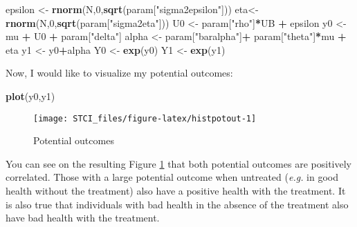 \documentclass[]{book}
\newenvironment{Shaded}{\begin{snugshade}}{\end{snugshade}}
\newcommand{\KeywordTok}[1]{\textcolor[rgb]{0.13,0.29,0.53}{\textbf{#1}}}
\newcommand{\DecValTok}[1]{\textcolor[rgb]{0.00,0.00,0.81}{#1}}
\newcommand{\StringTok}[1]{\textcolor[rgb]{0.31,0.60,0.02}{#1}}
\newcommand{\OperatorTok}[1]{\textcolor[rgb]{0.81,0.36,0.00}{\textbf{#1}}}
\newcommand{\NormalTok}[1]{#1}
\theoremstyle{definition}
\theoremstyle{definition}
\theoremstyle{definition}
\theoremstyle{remark}
\begin{document}
\begin{Shaded}
\begin{Highlighting}[]
\NormalTok{epsilon <-}\StringTok{ }\KeywordTok{rnorm}\NormalTok{(N,}\DecValTok{0}\NormalTok{,}\KeywordTok{sqrt}\NormalTok{(param[}\StringTok{"sigma2epsilon"}\NormalTok{]))}
\NormalTok{eta<-}\StringTok{ }\KeywordTok{rnorm}\NormalTok{(N,}\DecValTok{0}\NormalTok{,}\KeywordTok{sqrt}\NormalTok{(param[}\StringTok{"sigma2eta"}\NormalTok{]))}
\NormalTok{U0 <-}\StringTok{ }\NormalTok{param[}\StringTok{"rho"}\NormalTok{]}\OperatorTok{*}\NormalTok{UB }\OperatorTok{+}\StringTok{ }\NormalTok{epsilon}
\NormalTok{y0 <-}\StringTok{ }\NormalTok{mu }\OperatorTok{+}\StringTok{  }\NormalTok{U0 }\OperatorTok{+}\StringTok{ }\NormalTok{param[}\StringTok{"delta"}\NormalTok{]}
\NormalTok{alpha <-}\StringTok{ }\NormalTok{param[}\StringTok{"baralpha"}\NormalTok{]}\OperatorTok{+}\StringTok{  }\NormalTok{param[}\StringTok{"theta"}\NormalTok{]}\OperatorTok{*}\NormalTok{mu }\OperatorTok{+}\StringTok{ }\NormalTok{eta}
\NormalTok{y1 <-}\StringTok{ }\NormalTok{y0}\OperatorTok{+}\NormalTok{alpha}
\NormalTok{Y0 <-}\StringTok{ }\KeywordTok{exp}\NormalTok{(y0)}
\NormalTok{Y1 <-}\StringTok{ }\KeywordTok{exp}\NormalTok{(y1)}
\end{Highlighting}
\end{Shaded}

Now, I would like to visualize my potential outcomes:

\begin{Shaded}
\begin{Highlighting}[]
\KeywordTok{plot}\NormalTok{(y0,y1)}
\end{Highlighting}
\end{Shaded}

\begin{figure}

{\centering \texttt{[image: STCI\_files/figure-latex/histpotout-1]} 

}

\caption{Potential outcomes}\label{fig:histpotout}
\end{figure}

You can see on the resulting Figure \ref{fig:histpotout} that both
potential outcomes are positively correlated. Those with a large
potential outcome when untreated (\emph{e.g.} in good health without the
treatment) also have a positive health with the treatment. It is also
true that individuals with bad health in the absence of the treatment
also have bad health with the treatment.
\end{document}
